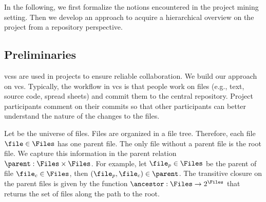 \label{sec:bpm2015concept}
In the following, we first formalize the notions encountered in the project mining setting. Then we develop an approach to acquire a hierarchical overview on the project from a repository perspective.

\subsection{Preliminaries}
\glspl{vcs} are used in projects to ensure reliable collaboration. We build our approach on \gls{vcs}. Typically, the workflow in \gls{vcs} is that people work on files (e.g., text, source code, spread sheets) and commit them to the central repository. Project participants comment on their commits so that other participants can better understand the nature of the changes to the files.

Let \Files be the universe of files. Files are organized in a file tree. Therefore, each file $\file \in \Files$ has one parent file. The only file without a parent file is the root file. We capture this information in the parent relation $\parent : \Files \times \Files$. For example, let $\file_p \in \Files$ be the parent of file $\file_c \in \Files$, then $(\file_p, \file_c) \in \parent$.
The transitive closure on the parent files is given by the function $\ancestor : \Files \rightarrow 2^{\Files}$ that returns the set of files along the path to the root.

